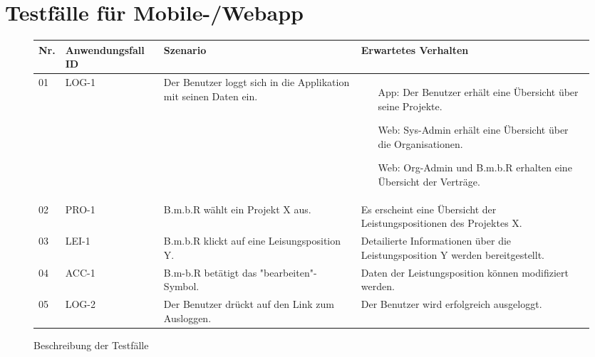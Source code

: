 
\section{Testfälle für Mobile-/Webapp}
\begin{figure}[!h]
	\begin{center}
		\begin{tabularx}{\textwidth}{ p{} | p{} | p{} | X }
			\textbf{Nr.} & \textbf{Anwendungsfall ID} & \textbf{Szenario} & \textbf{Erwartetes Verhalten} \\ \hline
			01 & LOG-1 & Der Benutzer loggt sich in die Applikation mit seinen Daten ein. &
			\begin{itemize}
				\item[App:] Der Benutzer erhält eine Übersicht über seine Projekte.
				\item[Web:] Sys-Admin erhält eine Übersicht über die Organisationen.
				\item[Web:] Org-Admin und B.m.b.R erhalten eine Übersicht der Verträge.
			\end{itemize} \\ \hline
			02 & PRO-1 & B.m.b.R wählt ein Projekt X aus. & Es erscheint eine Übersicht der Leistungspositionen des Projektes X. \\ \hline
			03 & LEI-1 & B.m.b.R klickt auf eine Leisungsposition Y. & Detailierte Informationen über die Leistungsposition Y werden bereitgestellt. \\ \hline
			04 & ACC-1 & B.m-b.R betätigt das "bearbeiten"-Symbol. & Daten der Leistungsposition können modifiziert werden. \\ \hline
			05 & LOG-2 & Der Benutzer drückt auf den Link zum Ausloggen. & Der Benutzer wird erfolgreich ausgeloggt. \\ \hline
		\end{tabularx}	
	\end{center}
	\caption{Beschreibung der Testfälle}
	\label{fig:testfaelle-beide-anwendungen-tabelle}
\end{figure}

